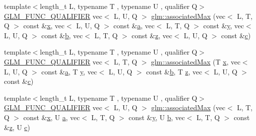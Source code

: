 \begin{DoxyCompactItemize}
{\footnotesize template$<$length\+\_\+t L, typename T , typename U , qualifier Q$>$ }\\\mbox{\hyperlink{setup_8hpp_a33fdea6f91c5f834105f7415e2a64407}{G\+L\+M\+\_\+\+F\+U\+N\+C\+\_\+\+Q\+U\+A\+L\+I\+F\+I\+ER}} vec$<$ L, U, Q $>$ \mbox{\hyperlink{group__gtx__associated__min__max_gab84fdc35016a31e8cd0cbb8296bddf7c}{glm\+::associated\+Max}} (vec$<$ L, T, Q $>$ const \&\mbox{\hyperlink{_s_d_l__opengl_8h_ad0e63d0edcdbd3d79554076bf309fd47}{x}}, vec$<$ L, U, Q $>$ const \&\mbox{\hyperlink{_s_d_l__opengl__glext_8h_a3309789fc188587d666cda5ece79cf82}{a}}, vec$<$ L, T, Q $>$ const \&\mbox{\hyperlink{_s_d_l__opengl_8h_a1675d9d7bb68e1657ff028643b4037e3}{y}}, vec$<$ L, U, Q $>$ const \&\mbox{\hyperlink{_s_d_l__opengl__glext_8h_a0f71581a41fd2264c8944126dabbd010}{b}}, vec$<$ L, T, Q $>$ const \&\mbox{\hyperlink{_s_d_l__opengl__glext_8h_a5e74030ebb3297ce1b37ff716fedd68f}{z}}, vec$<$ L, U, Q $>$ const \&\mbox{\hyperlink{_s_d_l__opengl__glext_8h_a1f2d7f8147412c43ba2303a56f97ee73}{c}})
\item 
{\footnotesize template$<$length\+\_\+t L, typename T , typename U , qualifier Q$>$ }\\\mbox{\hyperlink{setup_8hpp_a33fdea6f91c5f834105f7415e2a64407}{G\+L\+M\+\_\+\+F\+U\+N\+C\+\_\+\+Q\+U\+A\+L\+I\+F\+I\+ER}} vec$<$ L, T, Q $>$ \mbox{\hyperlink{group__gtx__associated__min__max_gadd2a2002f4f2144bbc39eb2336dd2fba}{glm\+::associated\+Max}} (T \mbox{\hyperlink{_s_d_l__opengl_8h_ad0e63d0edcdbd3d79554076bf309fd47}{x}}, vec$<$ L, U, Q $>$ const \&\mbox{\hyperlink{_s_d_l__opengl__glext_8h_a3309789fc188587d666cda5ece79cf82}{a}}, T \mbox{\hyperlink{_s_d_l__opengl_8h_a1675d9d7bb68e1657ff028643b4037e3}{y}}, vec$<$ L, U, Q $>$ const \&\mbox{\hyperlink{_s_d_l__opengl__glext_8h_a0f71581a41fd2264c8944126dabbd010}{b}}, T \mbox{\hyperlink{_s_d_l__opengl__glext_8h_a5e74030ebb3297ce1b37ff716fedd68f}{z}}, vec$<$ L, U, Q $>$ const \&\mbox{\hyperlink{_s_d_l__opengl__glext_8h_a1f2d7f8147412c43ba2303a56f97ee73}{c}})
\item 
{\footnotesize template$<$length\+\_\+t L, typename T , typename U , qualifier Q$>$ }\\\mbox{\hyperlink{setup_8hpp_a33fdea6f91c5f834105f7415e2a64407}{G\+L\+M\+\_\+\+F\+U\+N\+C\+\_\+\+Q\+U\+A\+L\+I\+F\+I\+ER}} vec$<$ L, U, Q $>$ \mbox{\hyperlink{group__gtx__associated__min__max_ga19f59d1141a51a3b2108a9807af78f7f}{glm\+::associated\+Max}} (vec$<$ L, T, Q $>$ const \&\mbox{\hyperlink{_s_d_l__opengl_8h_ad0e63d0edcdbd3d79554076bf309fd47}{x}}, U \mbox{\hyperlink{_s_d_l__opengl__glext_8h_a3309789fc188587d666cda5ece79cf82}{a}}, vec$<$ L, T, Q $>$ const \&\mbox{\hyperlink{_s_d_l__opengl_8h_a1675d9d7bb68e1657ff028643b4037e3}{y}}, U \mbox{\hyperlink{_s_d_l__opengl__glext_8h_a0f71581a41fd2264c8944126dabbd010}{b}}, vec$<$ L, T, Q $>$ const \&\mbox{\hyperlink{_s_d_l__opengl__glext_8h_a5e74030ebb3297ce1b37ff716fedd68f}{z}}, U \mbox{\hyperlink{_s_d_l__opengl__glext_8h_a1f2d7f8147412c43ba2303a56f97ee73}{c}})

\end{DoxyCompactItemize}
